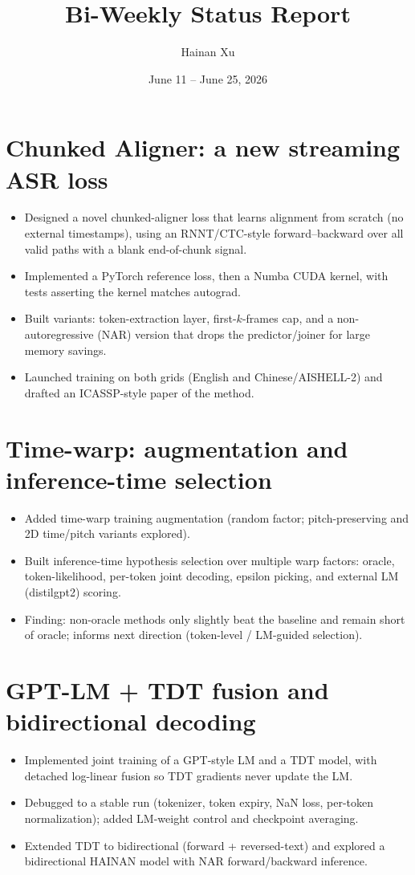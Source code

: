 \documentclass[11pt]{article}
\title{\vspace{-2.5em}\textbf{Bi-Weekly Status Report}}
\author{Hainan Xu}
\date{June 11 -- June 25, 2026}
\begin{document}
\maketitle
\vspace{-1.5em}

\section{Chunked Aligner: a new streaming ASR loss}
\begin{itemize}
  \item Designed a novel chunked-aligner loss that learns alignment from scratch (no external timestamps), using an RNNT/CTC-style forward--backward over all valid paths with a blank end-of-chunk signal.
  \item Implemented a PyTorch reference loss, then a Numba CUDA kernel, with tests asserting the kernel matches autograd.
  \item Built variants: token-extraction layer, first-$k$-frames cap, and a non-autoregressive (NAR) version that drops the predictor/joiner for large memory savings.
  \item Launched training on both grids (English and Chinese/AISHELL-2) and drafted an ICASSP-style paper of the method.
\end{itemize}

\section{Time-warp: augmentation and inference-time selection}
\begin{itemize}
  \item Added time-warp training augmentation (random factor; pitch-preserving and 2D time/pitch variants explored).
  \item Built inference-time hypothesis selection over multiple warp factors: oracle, token-likelihood, per-token joint decoding, epsilon picking, and external LM (distilgpt2) scoring.
  \item Finding: non-oracle methods only slightly beat the baseline and remain short of oracle; informs next direction (token-level / LM-guided selection).
\end{itemize}

\section{GPT-LM + TDT fusion and bidirectional decoding}
\begin{itemize}
  \item Implemented joint training of a GPT-style LM and a TDT model, with detached log-linear fusion so TDT gradients never update the LM.
  \item Debugged to a stable run (tokenizer, token expiry, NaN loss, per-token normalization); added LM-weight control and checkpoint averaging.
  \item Extended TDT to bidirectional (forward + reversed-text) and explored a bidirectional HAINAN model with NAR forward/backward inference.
\end{itemize}
\end{document}
